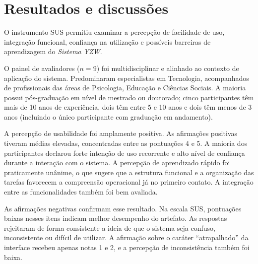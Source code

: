 \documentclass[12pt]{article}
\begin{document}

\section{Resultados e discussões}
\label{sec:resultado}
O instrumento SUS permitiu examinar a percepção de facilidade de uso, integração funcional, confiança na utilização e possíveis barreiras de aprendizagem do \textit{Sistema YZW}. %


O painel de avaliadores ($n=9$) foi multidisciplinar e alinhado ao contexto de aplicação do sistema. Predominaram especialistas em Tecnologia, acompanhados de profissionais das áreas de Psicologia, Educação e Ciências Sociais. A maioria possui pós-graduação em nível de mestrado ou doutorado; cinco participantes têm mais de 10 anos de experiência, dois têm entre 5 e 10 anos e dois têm menos de 3 anos (incluindo o único participante com graduação em andamento).

A percepção de usabilidade foi amplamente positiva. As afirmações positivas tiveram médias elevadas, concentradas entre as pontuações 4 e 5. A maioria dos participantes declarou forte intenção de uso recorrente e alto nível de confiança durante a interação com o sistema. A percepção de aprendizado rápido foi praticamente unânime, o que sugere que a estrutura funcional e a organização das tarefas favorecem a compreensão operacional já no primeiro contato. A integração entre as funcionalidades também foi bem avaliada.

As afirmações negativas confirmam esse resultado. Na escala SUS, pontuações baixas nesses itens indicam melhor desempenho do artefato. As respostas rejeitaram de forma consistente a ideia de que o sistema seja confuso, inconsistente ou difícil de utilizar. A afirmação sobre o caráter ``atrapalhado'' da interface recebeu apenas notas 1 e 2, e a percepção de inconsistência também foi baixa.
\end{document}
